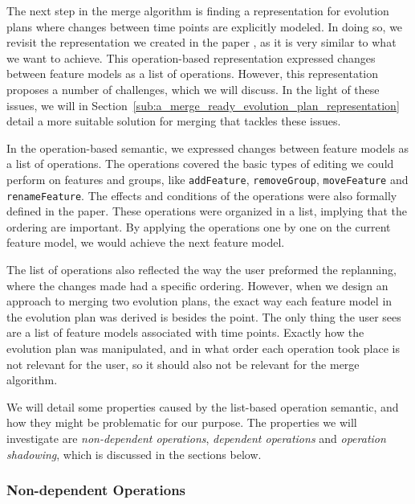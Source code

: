 \documentclass[a4paper,english]{ifimaster}
\begin{document}
The next step in the merge algorithm is finding a representation for evolution plans where changes between time points are explicitly modeled. In doing so, we revisit the representation we created in the paper \cite{cite:consistency_preserving_evolution_planning}, as it is very similar to what we want to achieve. This operation-based representation expressed changes between feature models as a list of operations. However, this representation proposes a number of challenges, which we will discuss. In the light of these issues, we will in Section~\vref{sub:a_merge_ready_evolution_plan_representation} detail a more suitable solution for merging that tackles these issues.

In the operation-based semantic, we expressed changes between feature models as a list of operations. The operations covered the basic types of editing we could perform on features and groups, like \texttt{addFeature}, \texttt{removeGroup}, \texttt{moveFeature} and \texttt{renameFeature}. The effects and conditions of the operations were also formally defined in the paper. These operations were organized in a list, implying that the ordering are important. By applying the operations one by one on the current feature model, we would achieve the next feature model.

The list of operations also reflected the way the user preformed the replanning, where the changes made had a specific ordering. However, when we design an approach to merging two evolution plans, the exact way each feature model in the evolution plan was derived is besides the point. The only thing the user sees are a list of feature models associated with time points. Exactly how the evolution plan was manipulated, and in what order each operation took place is not relevant for the user, so it should also not be relevant for the merge algorithm.

We will detail some properties caused by the list-based operation semantic, and how they might be problematic for our purpose. The properties we will investigate are \textit{non-dependent operations}, \textit{dependent operations} and \textit{operation shadowing}, which is discussed in the sections below.

\subsubsection{Non-dependent Operations}%
\label{ssub:non_dependent_operations}
\end{document}
